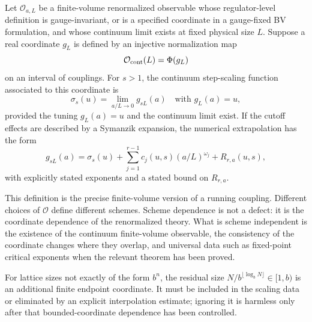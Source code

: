 \begin{definition}
\label{def:step-scaling-coordinate}
Let \(\mathcal O_{a,L}\) be a finite-volume renormalized observable whose
regulator-level definition is gauge-invariant, or is a specified coordinate
in a gauge-fixed BV formulation, and whose continuum limit exists at fixed
physical size \(L\).  Suppose a real coordinate \(g_L\) is defined by an
injective normalization map
\[
  \mathcal O_{\rm cont}(L)=\Phi(g_L)
\]
on an interval of couplings.  For \(s>1\), the continuum step-scaling
function associated to this coordinate is
\begin{equation}
  \sigma_s(u)
  =
  \lim_{a/L\to0}
  g_{sL}(a)
  \quad
  \text{with }g_L(a)=u,
  \label{eq:step-scaling-coordinate-definition}
\end{equation}
provided the tuning \(g_L(a)=u\) and the continuum limit exist.  If the
cutoff effects are described by a Symanzik expansion, the numerical
extrapolation has the form
\begin{equation}
  g_{sL}(a)=\sigma_s(u)+
  \sum_{j=1}^{r-1} c_j(u,s)(a/L)^{\omega_j}
  +
  R_{r,a}(u,s),
  \label{eq:step-scaling-symanzik-extrapolation}
\end{equation}
with explicitly stated exponents and a stated bound on \(R_{r,a}\).
\end{definition}

This definition is the precise finite-volume version of a running coupling.
Different choices of \(\mathcal O\) define different schemes.  Scheme
dependence is not a defect: it is the coordinate dependence of the
renormalized theory.  What is scheme independent is the existence of the
continuum finite-volume observable, the consistency of the coordinate
changes where they overlap, and universal data such as fixed-point critical
exponents when the relevant theorem has been proved.

For lattice sizes not exactly of the form \(b^n\), the residual size
\(N/b^{\lfloor\log_bN\rfloor}\in[1,b)\) is an additional finite endpoint
coordinate.  It must be included in the scaling data or eliminated by an
explicit interpolation estimate; ignoring it is harmless only after that
bounded-coordinate dependence has been controlled.

